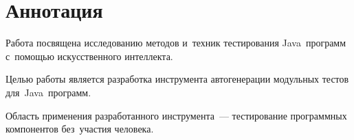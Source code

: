 \chapter*{Аннотация} \label{annotation}


\hspace*{2.5em}Работа посвящена исследованию методов и~техник тестирования Java~программ с~помощью искусственного интеллекта. 

Целью работы является разработка инструмента автогенерации модульных тестов для~Java~программ. 

Область применения разработанного инструмента~--- тестирование программных компонентов без~участия человека. 